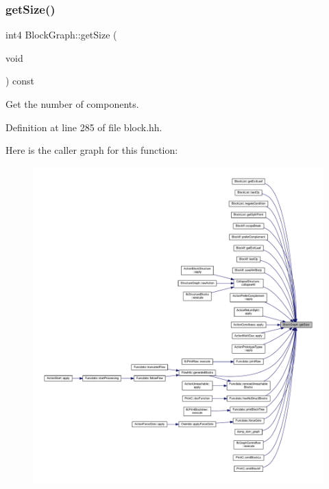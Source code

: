 \subsubsection{\texorpdfstring{getSize()}{getSize()}}
{\footnotesize\ttfamily int4 Block\+Graph\+::get\+Size (\begin{DoxyParamCaption}\item[{void}]{ }\end{DoxyParamCaption}) const\hspace{0.3cm}{\ttfamily [inline]}}



Get the number of components. 



Definition at line 285 of file block.\+hh.

Here is the caller graph for this function\+:
\nopagebreak
\begin{figure}[H]
\begin{center}
\leavevmode
\includegraphics[width=350pt]{class_block_graph_a12bc7480ffcc4c163a2a2cd800742f09_icgraph}
\end{center}
\end{figure}
\mbox{\label{class_block_graph_ae4f8f8599ed5e3eb803536f1c9595f09}} 
